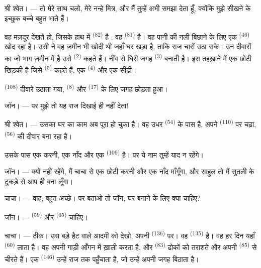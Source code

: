 \VUsaut{3.0mm}

\textsc{श्री श्वेत}। --- तो मेरे साथ चलो, मेरे नन्हे मित्र, और मैं तुम्हें अभी
समझा देता हूँ, क्योंकि मुझे सीखने के इच्छुक बच्चे बहुत भाते हैं।

वह मज़दूर देखते हो, जिसके हाथ में  \textsuperscript{(82)} है : वह
 \textsuperscript{(81)} है। वह पानी की नली बिछाने के लिए
एक  \textsuperscript{(46)} खोद रहा है। उसी ने वह ज़मीन भी खोदी थी
जहाँ घर खड़ा है, ताकि राज चारों  उठा सके। उन दीवारों का जो भाग
ज़मीन में है उसे  \textsuperscript{(2)} कहते हैं। नींव से घिरी जगह
 \textsuperscript{(3)} बनाती है। इस तहख़ाने में एक छोटी खिड़की है
जिसे  \textsuperscript{(5)} कहते हैं, एक 
\textsuperscript{(4)} और एक सीढ़ी।

 \textsuperscript{(108)} दीवारें उठाता गया, 
\textsuperscript{(8)} और  \textsuperscript{(17)} के लिए जगह
छोड़ता हुआ।

\textsc{जॉन}। --- पर मुझे तो यह राज दिखाई ही नहीं देता!

\textsc{श्री श्वेत}। --- उसका घर का काम अब पूरा हो चुका है। वह उधर
 \textsuperscript{(54)} के पास है, अपने 
\textsuperscript{(110)} पर चढ़ा,  \textsuperscript{(56)} की दीवार
बना रहा है।

उसके पास एक करनी, एक नाँद और एक  \textsuperscript{(109)} है। पर ये
नाम तुम्हें याद न रहेंगे।

\textsc{जॉन}। --- क्यों नहीं रहेंगे, मैं चाचा से एक छोटी करनी और एक नाँद
माँगूँगा, और साहुल तो मैं सुतली के टुकड़े से आप ही बना लूँगा।

\VUsaut{3.0mm}
\VUsaut{3.0mm}

\textsc{चाचा}। --- वाह, बहुत अच्छे। पर बताओ तो जॉन, घर बनाने के लिए क्या चाहिए?

\textsc{जॉन}। ---  \textsuperscript{(59)} और
 \textsuperscript{(65)} चाहिए।

\textsc{चाचा}। --- ठीक। उस बड़े हैट वाले आदमी को देखो, अपनी 
\textsuperscript{(136)} पर। वह  \textsuperscript{(135)} है। वह हर
दिन यहाँ  \textsuperscript{(60)} लाता है। वह अपनी गाड़ी
आँगन में ख़ाली करता है, और  \textsuperscript{(83)} ढोकों को
तराशते और अपनी  \textsuperscript{(85)} से चीरते हैं। एक
 \textsuperscript{(146)} उन्हें राज तक पहुँचाता है, जो उन्हें अपनी
जगह बिठाता है।

